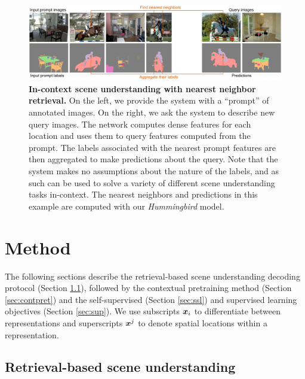 \documentclass{article}
\newcommand{\ours}{\textit{Hummingbird} }
\begin{document}
\begin{figure}[t]
  \begin{center}
    \includegraphics[width=1.0\textwidth]{figures/figure_demo_bis.pdf}
  \end{center}
\vspace{-1em}
\caption{\textbf{In-context scene understanding with nearest neighbor retrieval.} On the left, we provide the system with a ``prompt'' of annotated images. On the right, we ask the system to describe new query images. The network computes dense features for each location and uses them to query features computed from the prompt. The labels associated with the nearest prompt features are then aggregated to make predictions about the query. Note that the system makes no assumptions about the nature of the labels, and as such can be used to solve a variety of different scene understanding tasks in-context. The nearest neighbors and predictions in this example are computed with our \ours model.}
\label{fig:demo}
\end{figure}


\section{Method}
The following sections describe the retrieval-based scene understanding decoding protocol (Section \ref{sec:scene}), followed by the contextual pretraining method (Section \ref{sec:contpret}) and the self-supervised (Section \ref{sec:ssl}) and supervised learning objectives (Section \ref{sec:sup}). We use subscripts ${\bm{x}}_i$ to differentiate between representations and superscripts ${\bm{x}}^j$ to denote spatial locations within a representation. 

\subsection{Retrieval-based scene understanding} \label{sec:scene}
\end{document}
